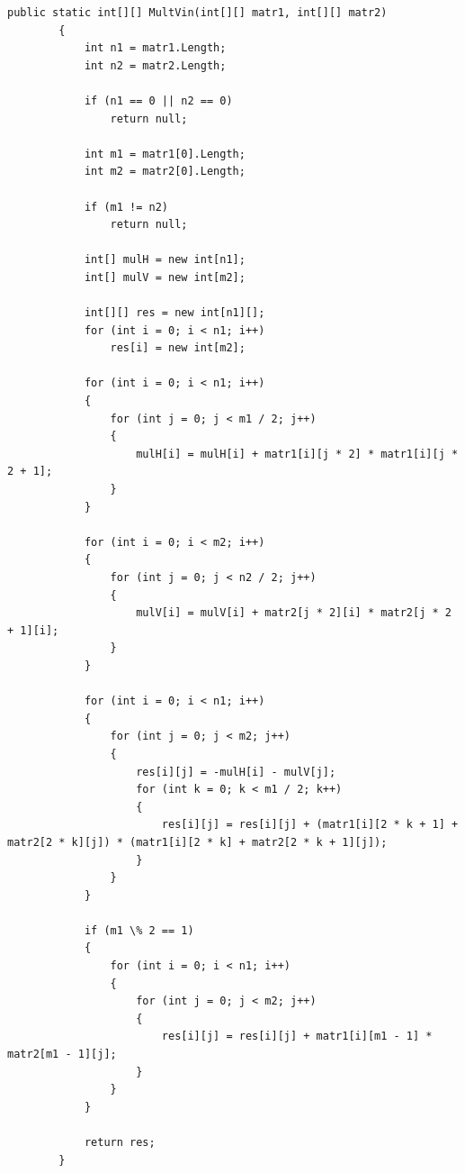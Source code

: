 \documentclass[12pt]{report}
\begin{document}
\begin{lstlisting}[label=some-code,caption=Алгоритм Винограда]
public static int[][] MultVin(int[][] matr1, int[][] matr2)
        {
            int n1 = matr1.Length;
            int n2 = matr2.Length;

            if (n1 == 0 || n2 == 0)
                return null;

            int m1 = matr1[0].Length;
            int m2 = matr2[0].Length;

            if (m1 != n2)
                return null;

            int[] mulH = new int[n1];
            int[] mulV = new int[m2];

            int[][] res = new int[n1][];
            for (int i = 0; i < n1; i++)
                res[i] = new int[m2];

            for (int i = 0; i < n1; i++)
            {
                for (int j = 0; j < m1 / 2; j++)
                {
                    mulH[i] = mulH[i] + matr1[i][j * 2] * matr1[i][j * 2 + 1];
                }
            }

            for (int i = 0; i < m2; i++)
            {
                for (int j = 0; j < n2 / 2; j++)
                {
                    mulV[i] = mulV[i] + matr2[j * 2][i] * matr2[j * 2 + 1][i];
                }
            }

            for (int i = 0; i < n1; i++)
            {
                for (int j = 0; j < m2; j++)
                {
                    res[i][j] = -mulH[i] - mulV[j];
                    for (int k = 0; k < m1 / 2; k++)
                    {
                        res[i][j] = res[i][j] + (matr1[i][2 * k + 1] + matr2[2 * k][j]) * (matr1[i][2 * k] + matr2[2 * k + 1][j]);
                    }
                }
            }

            if (m1 \% 2 == 1)
            {
                for (int i = 0; i < n1; i++)
                {
                    for (int j = 0; j < m2; j++)
                    {
                        res[i][j] = res[i][j] + matr1[i][m1 - 1] * matr2[m1 - 1][j];
                    }
                }
            }

            return res;
        }
\end{lstlisting}
\end{document}
